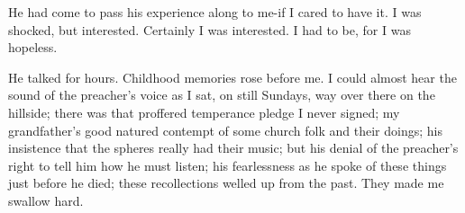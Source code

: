 \begin{biblechapter}
\verse He had come to pass his experience along to me-if I cared to have it.
\verse I was shocked, but interested.
\verse Certainly I was interested.
\verse I had to be, for I was hopeless.

\verse He talked for hours.
\verse Childhood memories rose before me.
\verse I could almost hear the sound of the preacher's voice as I sat, 
    on still Sundays, 
    way over there on the hillside;
    there was that proffered temperance pledge I never signed;
    my grandfather's good natured contempt of some church folk and their doings;
    his insistence that the spheres really had their music;
    but his denial of the preacher's right to tell him how he must listen; 
    his fearlessness as he spoke of these things just before he died; 
    these recollections welled up from the past.
\verse They made me swallow hard.
\end{biblechapter}


